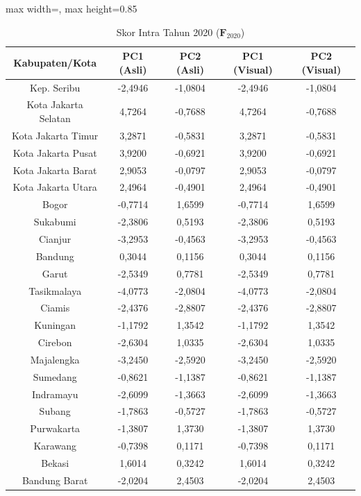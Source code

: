 \begin{table}[H]
\centering
\caption{Skor Intra Tahun 2020 ($\mathbf{F}_{2020}$)} \label{tab:app1skor_intra_2020}
\begin{adjustbox}{max width=\textwidth, max height=0.85\textheight}
\begin{tabular}{|c|c|c|c|c|}
\hline
\textbf{Kabupaten/Kota} & \textbf{PC1 (Asli)} & \textbf{PC2 (Asli)} & \textbf{PC1 (Visual)} & \textbf{PC2 (Visual)} \\
\hline
Kep. Seribu & -2,4946 & -1,0804 & -2,4946 & -1,0804 \\
Kota Jakarta Selatan & 4,7264 & -0,7688 & 4,7264 & -0,7688 \\
Kota Jakarta Timur & 3,2871 & -0,5831 & 3,2871 & -0,5831 \\
Kota Jakarta Pusat & 3,9200 & -0,6921 & 3,9200 & -0,6921 \\
Kota Jakarta Barat & 2,9053 & -0,0797 & 2,9053 & -0,0797 \\
Kota Jakarta Utara & 2,4964 & -0,4901 & 2,4964 & -0,4901 \\
Bogor & -0,7714 & 1,6599 & -0,7714 & 1,6599 \\
Sukabumi & -2,3806 & 0,5193 & -2,3806 & 0,5193 \\
Cianjur & -3,2953 & -0,4563 & -3,2953 & -0,4563 \\
Bandung & 0,3044 & 0,1156 & 0,3044 & 0,1156 \\
Garut & -2,5349 & 0,7781 & -2,5349 & 0,7781 \\
Tasikmalaya & -4,0773 & -2,0804 & -4,0773 & -2,0804 \\
Ciamis & -2,4376 & -2,8807 & -2,4376 & -2,8807 \\
Kuningan & -1,1792 & 1,3542 & -1,1792 & 1,3542 \\
Cirebon & -2,6304 & 1,0335 & -2,6304 & 1,0335 \\
Majalengka & -3,2450 & -2,5920 & -3,2450 & -2,5920 \\
Sumedang & -0,8621 & -1,1387 & -0,8621 & -1,1387 \\
Indramayu & -2,6099 & -1,3663 & -2,6099 & -1,3663 \\
Subang & -1,7863 & -0,5727 & -1,7863 & -0,5727 \\
Purwakarta & -1,3807 & 1,3730 & -1,3807 & 1,3730 \\
Karawang & -0,7398 & 0,1171 & -0,7398 & 0,1171 \\
Bekasi & 1,6014 & 0,3242 & 1,6014 & 0,3242 \\
Bandung Barat & -2,0204 & 2,4503 & -2,0204 & 2,4503 \\

\end{tabular}
\end{adjustbox}
\end{table}
